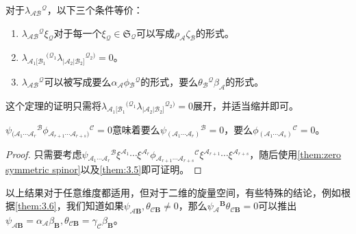\begin{them}[label={them:3.7}]{}
	对于$\lambda {_{\mathcal{AB}}}^{\mathcal{Q}}$，以下三个条件等价：
	\begin{enumerate}[label=(\alph*)]
		\item $\lambda {_{\mathcal{AB}}}^{\mathcal{Q}} \xi _{\mathcal{Q}}$对于每一个$\xi _{\mathcal{Q}} \in \mathfrak{S}_{\mathcal{Q}}$可以写成$\rho _{\mathcal{A}} \zeta _{\mathcal{B}}$的形式。
		\item $\lambda {_{\mathcal{A}_{1}[\mathcal{B}_{1}}}^{(\mathcal{Q}_{1}} \lambda {_{|\mathcal{A}_{2} |\mathcal{B}_{2}]}}^{\mathcal{Q}_{2})} =0$。
		\item $\lambda {_{\mathcal{AB}}}^{\mathcal{Q}}$可以被写成要么$\alpha _{\mathcal{A}} \phi {_{\mathcal{B}}}^{\mathcal{Q}}$的形式，要么$\theta {_{\mathcal{B}}}^{\mathcal{Q}} \beta _{\mathcal{A}}$的形式。
	\end{enumerate}
\end{them}

这个定理的证明只需将$\lambda {_{\mathcal{A}_{1}[\mathcal{B}_{1}}}^{(\mathcal{Q}_{1}} \lambda {_{|\mathcal{A}_{2} |\mathcal{B}_{2}]}}^{\mathcal{Q}_{2})} =0$展开，并适当缩并即可。

\begin{them}[label={them:3.8}]{}
	$\psi {_{(\mathcal{A}_{1} \cdots \mathcal{A}_{r}}}^{\mathcal{B}} \phi {_{\mathcal{A}_{r+1} \cdots \mathcal{A}_{r+s})}}^{\mathcal{C}} =0$意味着要么$\psi {_{(\mathcal{A}_{1} \cdots \mathcal{A}_{r})}}^{\mathcal{B}} =0$，要么$\phi {_{(\mathcal{A}_{1} \cdots \mathcal{A}_{s})}}^{\mathcal{C}} =0$。
\end{them}

\begin{proof}
	只需要考虑$\psi {_{\mathcal{A}_{1} \cdots \mathcal{A}_{r}}}^{\mathcal{B}} \xi ^{\mathcal{A}_{1}} \cdots \xi ^{\mathcal{A}_{r}} \phi {_{\mathcal{A}_{r+1} \cdots \mathcal{A}_{r+s}}}^{\mathcal{C}} \xi ^{\mathcal{A}_{r+1}} \cdots \xi ^{\mathcal{A}_{r+s}}$，随后使用\ref{them:zero symmetric spinor}以及\ref{them:3.5}即可证明。
\end{proof}


以上结果对于任意维度都适用，但对于二维的旋量空间，有些特殊的结论，例如根据\ref{them:3.6}，我们知道如果$\psi _{\mathcal{A}\boldsymbol{B}} ,\theta _{\mathcal{C}\boldsymbol{B}} \neq 0$，那么$\psi {_{\mathcal{A}}}^{\boldsymbol{B}} \theta _{\mathcal{C}\boldsymbol{B}} =0$可以推出$\psi _{\mathcal{A}\boldsymbol{B}} =\alpha _{\mathcal{A}} \beta _{\boldsymbol{B}} ,\theta _{\mathcal{C}\boldsymbol{B}} =\gamma _{\mathcal{C}} \beta _{\boldsymbol{B}}$。


